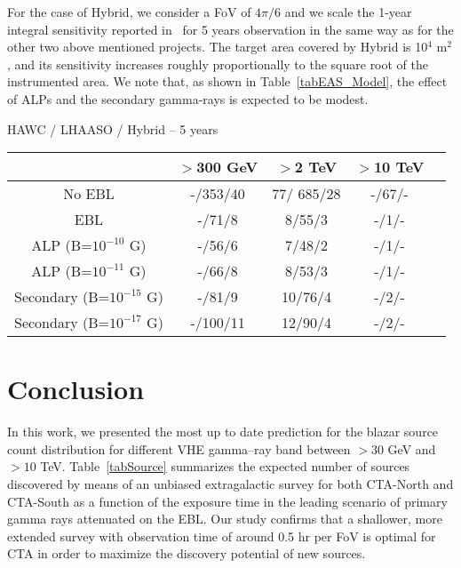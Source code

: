 \documentclass[final,5p]{elsarticle}
\begin{document}
For the case of Hybrid, we consider a FoV of $4\pi /6$ and we scale the 1-year integral sensitivity reported in~\cite{Hybrid} for 5 years observation in the same way as for the other two above mentioned projects. The target area covered by Hybrid is 10$^4$ m$^2$, and its sensitivity increases roughly proportionally to the square root of the instrumented area. We note that, as shown in Table~\ref{tabEAS_Model}, the effect of ALPs and the secondary gamma-rays is expected to be modest. 

\begin{table*}[h!]
\begin{center}
HAWC / LHAASO / Hybrid -- 5 years\\
\begin{tabular}{ccccc}
\midrule
& $>$300 GeV  & $>$2 TeV   & $>$10 TeV  \\
\midrule
\addlinespace
No EBL   &  -/353/40  & 77/ 685/28  &  -/67/-  \\
EBL   &  -/71/8  &  8/55/3  &  -/1/- \\
ALP (B=$10^{-10}$ G)   &  -/56/6  &  7/48/2  &  -/1/-    \\
ALP (B=$10^{-11}$ G)    &  -/66/8  &  8/53/3  &  -/1/- \\
Secondary (B=$10^{-15}$ G)    &  -/81/9  &  10/76/4  &  -/2/- \\
Secondary (B=$10^{-17}$ G)   &  -/100/11  &  12/90/4  &  -/2/-  \\
 \bottomrule
\end{tabular}
\end{center}
\caption{Estimated source count with 5 years of HAWC/LHAASO/Hybrid data, in different energy bands and for the models considered in this paper. See text for further details. Note: `-' mark denotes a missing result due to integral flux sensitivity not available for the instrument in the specific energy band.}
\label{tabEAS_Model}
\end{table*}
 


\section{Conclusion}\label{sec:Conclusions}
In this work, we presented the most up to date prediction for the blazar source count distribution for different VHE gamma--ray band between  $>30$ GeV and $>10$ TeV. Table~\ref{tabSource} summarizes the expected number of sources discovered by means of an unbiased extragalactic survey for both CTA-North and CTA-South as a function of the exposure time in the leading scenario of primary gamma rays attenuated on the EBL. Our study confirms that a shallower, more extended survey with observation time of around 0.5 hr per FoV is optimal for CTA in order to maximize the discovery potential of new sources. 
\end{document}
